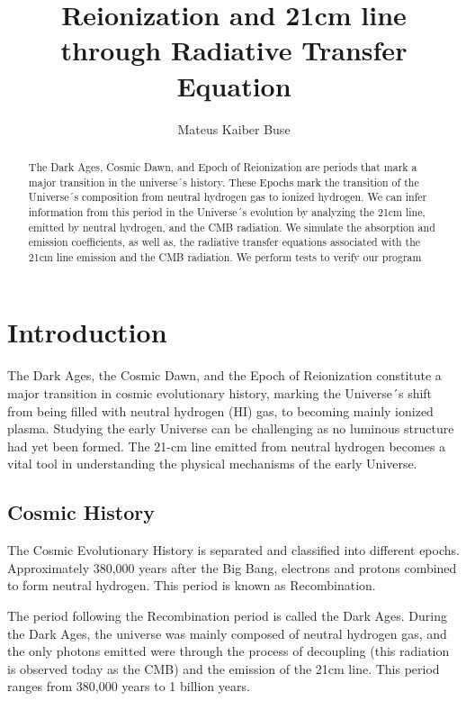 \documentclass[apj]{emulateapj}
\begin{document}
\title{Reionization and 21cm line through Radiative Transfer Equation}
 
\author{Mateus Kaiber Buse}
 
\begin{abstract}
The Dark Ages, Cosmic Dawn, and Epoch of Reionization are periods that mark a major transition in the universe´s history. These Epochs mark the transition of the Universe´s composition from neutral hydrogen gas to ionized hydrogen. We can infer information from this period in the Universe´s evolution by analyzing the 21cm line, emitted by neutral hydrogen, and the CMB radiation. We simulate the absorption and emission coefficients, as well as, the radiative transfer equations associated with the 21cm line emission and the CMB radiation. We perform tests to verify our program

\end{abstract}



\section{Introduction}
\label{sec:intro}
The Dark Ages, the Cosmic Dawn, and the Epoch of Reionization constitute a major transition in cosmic evolutionary history, marking the Universe´s shift from being filled with neutral hydrogen (HI) gas, to becoming mainly ionized plasma. Studying the early Universe can be challenging as no luminous structure had yet been formed. The 21-cm line emitted from neutral hydrogen becomes a vital tool in understanding the physical mechanisms of the early Universe.

\subsection{Cosmic History}
The Cosmic Evolutionary History is separated and classified into different epochs. Approximately 380,000 years after the Big Bang, electrons and protons combined to form neutral hydrogen. This period is known as Recombination.

The period following the Recombination period is called the Dark Ages. During the Dark Ages, the universe was mainly composed of neutral hydrogen gas, and the only photons emitted were through the process of decoupling (this radiation is observed today as the CMB) and the emission of the 21cm line. This period ranges from 380,000 years to 1 billion years.
\end{document}
